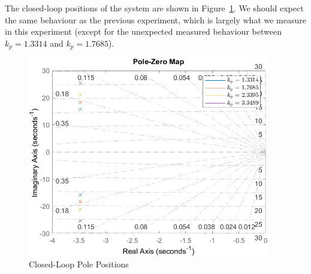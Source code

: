 \documentclass[12pt]{article}
\begin{document}
The closed-loop positions of the system are shown in Figure~\ref{fig:exp2_pole}. We should expect the same behaviour as the previous experiment, which is largely what we measure in this experiment (except for the unexpected measured behaviour between $k_p = 1.3314$ and $k_p = 1.7685$).

\begin{figure}[h]
    \centering
    \includegraphics[width=0.94\textwidth]{exp2_pole}
    \caption{\label{fig:exp2_pole}Closed-Loop Pole Positions}
\end{figure}

\setcounter{section}{5}
\end{document}
